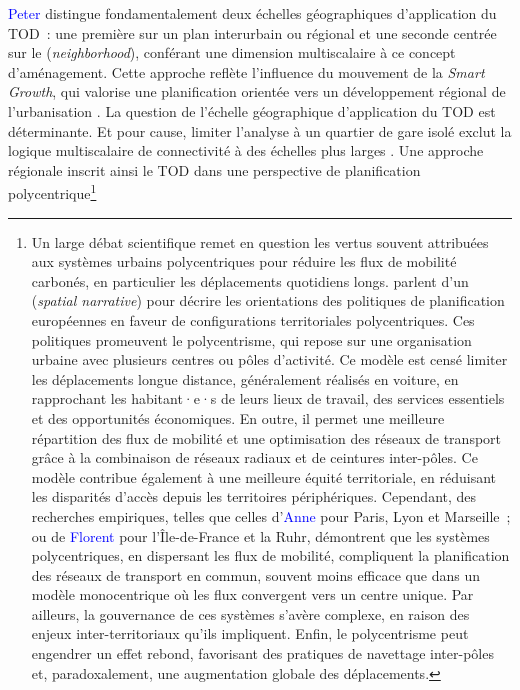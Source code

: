 \begin{refsegment}
\textcolor{blue}{Peter} \textcolor{blue}{\textcite[62, 67, 104]{calthorpe_next_1993}} distingue fondamentalement deux échelles géographiques d'application du \acrshort{TOD}~: une première sur un plan interurbain ou régional et une seconde centrée sur le  (\textsl{neighborhood}), conférant une dimension multiscalaire à ce concept d’aménagement. Cette approche reflète l’influence du mouvement de la \textsl{Smart Growth}, qui valorise une planification orientée vers un développement régional de l’urbanisation \textcolor{blue}{\autocite[70]{dushina_tod_2015}}. La question de l’échelle géographique d’application du \acrshort{TOD} est déterminante. Et pour cause, limiter l’analyse à un quartier de gare isolé exclut la logique multiscalaire de connectivité à des échelles plus larges \textcolor{blue}{\autocite[273]{menerault_gares_2001}}. Une approche régionale inscrit ainsi le \acrshort{TOD} dans une perspective de planification polycentrique\footnote{
    Un large débat scientifique remet en question les vertus souvent attribuées aux systèmes urbains polycentriques pour réduire les flux de mobilité carbonés, en particulier les déplacements quotidiens longs. \textcolor{blue}{\textcite[515]{richardson_discourses_2000}} parlent d'un  (\textsl{spatial narrative}) pour décrire les orientations des politiques de planification européennes en faveur de configurations territoriales polycentriques. Ces politiques promeuvent le polycentrisme, qui repose sur une organisation urbaine avec plusieurs centres ou pôles d'activité. Ce modèle est censé limiter les déplacements longue distance, généralement réalisés en voiture, en rapprochant les habitant·e·s de leurs lieux de travail, des services essentiels et des opportunités économiques. En outre, il permet une meilleure répartition des flux de mobilité et une optimisation des réseaux de transport grâce à la combinaison de réseaux radiaux et de ceintures inter-pôles. Ce modèle contribue également à une meilleure équité territoriale, en réduisant les disparités d'accès depuis les territoires périphériques. Cependant, des recherches empiriques, telles que celles d’\textcolor{blue}{Anne} \textcolor{blue}{\textcite[1~545]{aguilera_growth_2005}} pour Paris, Lyon et Marseille~; ou de \textcolor{blue}{Florent} \textcolor{blue}{\textcite{le_nechet_modelling_2019}} pour l'Île-de-France et la Ruhr, démontrent que les systèmes polycentriques, en dispersant les flux de mobilité, compliquent la planification des réseaux de \gls{transport en commun}, souvent moins efficace que dans un modèle monocentrique où les flux convergent vers un centre unique. Par ailleurs, la gouvernance de ces systèmes s'avère complexe, en raison des enjeux inter-territoriaux qu'ils impliquent. Enfin, le polycentrisme peut engendrer un effet rebond, favorisant des pratiques de navettage inter-pôles et, paradoxalement, une augmentation globale des déplacements.
}
\end{refsegment}
